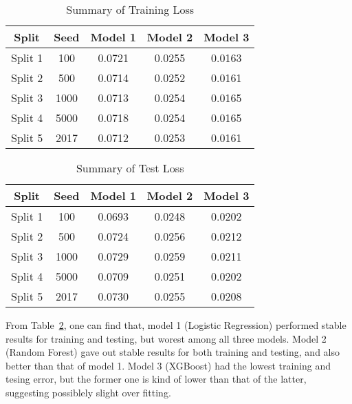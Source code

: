 \documentclass[12pt]{article}
\begin{document}
\begin{table}[htb]
 \caption{Summary of Training Loss} \label{result}
 \vspace{0.1in}
\begin{center}
  \begin{tabular}{  c  c  c  c  c}
    \hline
    Split            & Seed        & Model 1    & Model 2    & Model 3 \\ \hline
    Split 1         & 100    &0.0721    &0.0255    &0.0163\\ \hline
    Split 2         & 500    &0.0714    &0.0252    &0.0161\\ \hline
    Split 3         & 1000    &0.0713    &0.0254    &0.0165\\ \hline
    Split 4         & 5000    &0.0718    &0.0254    &0.0165\\ \hline
    Split 5         & 2017    &0.0712    &0.0253    &0.0161\\ \hline
  \end{tabular}
\end{center}
\end{table}
\begin{table}[htb]
 \caption{Summary of Test Loss} \label{result}
 \vspace{0.1in}
\begin{center}
  \begin{tabular}{  c  c  c  c  c}
    \hline
    Split            & Seed        & Model 1    & Model 2    & Model 3 \\ \hline
    Split 1         & 100    &0.0693    &0.0248    &0.0202\\ \hline
    Split 2         & 500    &0.0724    &0.0256    &0.0212\\ \hline
    Split 3         & 1000    &0.0729    &0.0259    &0.0211\\ \hline
    Split 4         & 5000    &0.0709    &0.0251    &0.0202\\ \hline
    Split 5         & 2017    &0.0730    &0.0255    &0.0208\\ \hline
  \end{tabular}
\end{center}
\end{table}


From Table~\ref{result}, one can find that, model 1 (Logistic Regression) performed stable results for training and testing, but worest among all three models. Model 2 (Random Forest) gave out stable results for both training and testing, and also better than that of model 1. Model 3 (XGBoost) had the lowest training and tesing error, but the former one is kind of lower than that of the latter, suggesting possiblely slight over fitting.
\end{document}
